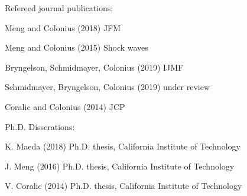 Refereed journal publications\+: \begin{DoxyItemize}
\item Meng and Colonius (2018) J\+FM \item Meng and Colonius (2015) Shock waves \item Bryngelson, Schmidmayer, Colonius (2019) I\+J\+MF \item Schmidmayer, Bryngelson, Colonius (2019) under review \item Coralic and Colonius (2014) J\+CP\end{DoxyItemize}
Ph.\+D. Disserations\+: \begin{DoxyItemize}
\item K. Maeda (2018) Ph.\+D. thesis, California Institute of Technology \item J. Meng (2016) Ph.\+D. thesis, California Institute of Technology \item V. Coralic (2014) Ph.\+D. thesis, California Institute of Technology \end{DoxyItemize}
